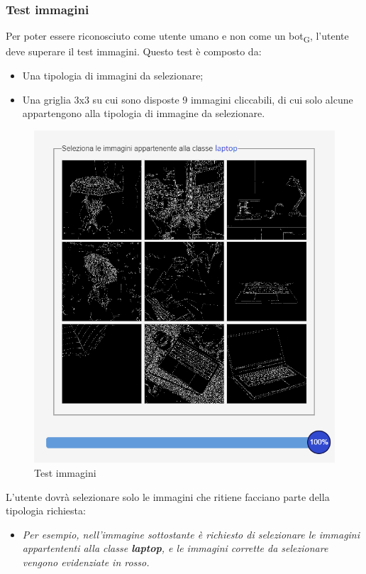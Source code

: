 \subsubsection{Test immagini}
Per poter essere riconosciuto come utente umano e non come un bot\textsubscript{G}, l'utente deve superare il test immagini. Questo test è composto da:
\begin{itemize}
    \item Una tipologia di immagini da selezionare;
	\item Una griglia 3x3 su cui sono disposte 9 immagini cliccabili, di cui solo alcune appartengono alla tipologia di immagine da selezionare.
\end{itemize} 

\begin{figure}[H]
    \centering
    \includegraphics[scale=0.6]{src/img/computerlaptop.png}
    \caption{Test immagini}
\end{figure}

\newpage
 
L'utente dovrà selezionare solo le immagini che ritiene facciano parte della tipologia richiesta:
\begin{itemize}
	\item \textit{Per esempio, nell'immagine sottostante è richiesto di selezionare le immagini appartententi alla classe \textbf{laptop}, e le immagini corrette da selezionare vengono evidenziate in rosso.}
\end{itemize} 

